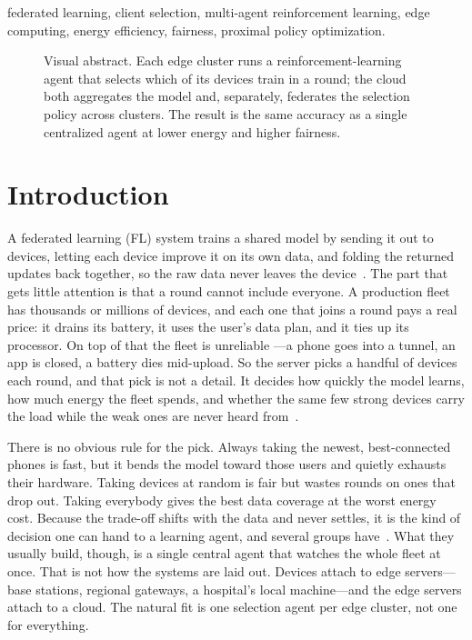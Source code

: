 \documentclass[conference]{IEEEtran}
\begin{document}
\begin{IEEEkeywords}
federated learning, client selection, multi-agent reinforcement learning, edge
computing, energy efficiency, fairness, proximal policy optimization.
\end{IEEEkeywords}

\begin{figure}[t]
\centering
{}
\caption{Visual abstract. Each edge cluster runs a reinforcement-learning agent
that selects which of its devices train in a round; the cloud both aggregates the
model and, separately, federates the selection policy across clusters. The result
is the same accuracy as a single centralized agent at lower energy and higher
fairness.}
\label{fig:abstract}
\end{figure}

\section{Introduction}
A federated learning (FL) system trains a shared model by sending it out to
devices, letting each device improve it on its own data, and folding the returned
updates back together, so the raw data never leaves the device~\cite{mcmahan2017,
kairouz2021}. The part that gets little attention is that a round cannot include
everyone. A production fleet has thousands or millions of devices, and each one
that joins a round pays a real price: it drains its battery, it uses the user's
data plan, and it ties up its processor. On top of that the fleet is unreliable
---a phone goes into a tunnel, an app is closed, a battery dies mid-upload. So the
server picks a handful of devices each round, and that pick is not a detail. It
decides how quickly the model learns, how much energy the fleet spends, and
whether the same few strong devices carry the load while the weak ones are never
heard from~\cite{nishio2019,lai2021}.

There is no obvious rule for the pick. Always taking the newest, best-connected
phones is fast, but it bends the model toward those users and quietly exhausts
their hardware. Taking devices at random is fair but wastes rounds on ones that
drop out. Taking everybody gives the best data coverage at the worst energy cost.
Because the trade-off shifts with the data and never settles, it is the kind of
decision one can hand to a learning agent, and several groups have~\cite{wang2020}.
What they usually build, though, is a single central agent that watches the whole
fleet at once. That is not how the systems are laid out. Devices attach to edge
servers---base stations, regional gateways, a hospital's local machine---and the
edge servers attach to a cloud. The natural fit is one selection agent per edge
cluster, not one for everything.
\end{document}

